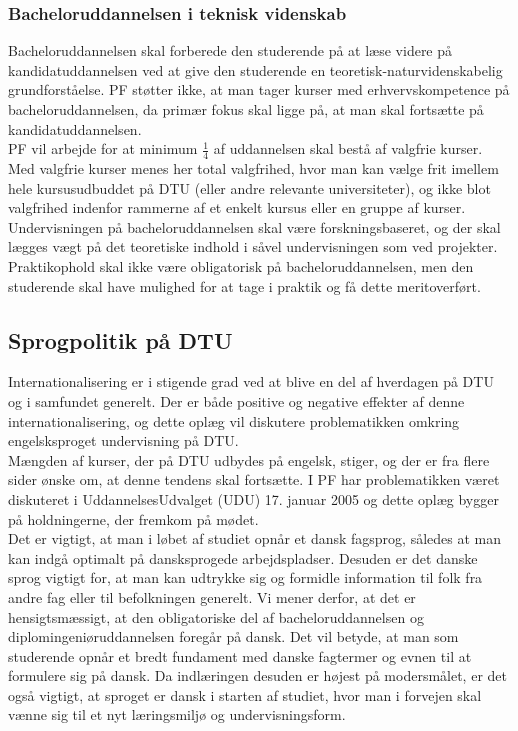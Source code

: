 \subsubsection{Bacheloruddannelsen i teknisk videnskab}
Bacheloruddannelsen skal forberede den studerende på at læse videre på kandidatuddannelsen ved at give den studerende en teoretisk-naturvidenskabelig grundforståelse. PF støtter ikke, at man tager kurser med erhvervskompetence på bacheloruddannelsen, da primær fokus skal ligge på, at man skal fortsætte på kandidatuddannelsen.\\

PF vil arbejde for at minimum $\frac{1}{4}$ af uddannelsen skal bestå af valgfrie kurser. Med valgfrie kurser menes her total valgfrihed, hvor man kan vælge frit imellem hele kursusudbuddet på DTU (eller andre relevante universiteter), og ikke blot valgfrihed indenfor rammerne af et enkelt kursus eller en gruppe af kurser.\\

Undervisningen på bacheloruddannelsen skal være forskningsbaseret, og der skal lægges vægt på det teoretiske indhold i såvel undervisningen som ved projekter. Praktikophold skal ikke være obligatorisk på bacheloruddannelsen, men den studerende skal have mulighed for at tage i praktik og få dette meritoverført.

\subsection{Sprogpolitik på DTU}
Internationalisering er i stigende grad ved at blive en del af hverdagen på DTU og i samfundet generelt. Der er både positive og negative effekter af denne internationalisering, og dette oplæg vil diskutere problematikken omkring engelsksproget undervisning på DTU.\\

Mængden af kurser, der på DTU udbydes på engelsk, stiger, og der er fra flere sider ønske om, at denne tendens skal fortsætte. I PF har problematikken været diskuteret i UddannelsesUdvalget (UDU) 17. januar 2005 og dette oplæg bygger på holdningerne, der fremkom på mødet.\\

Det er vigtigt, at man i løbet af studiet opnår et dansk fagsprog, således at man kan indgå optimalt på dansksprogede arbejdspladser. Desuden er det danske sprog vigtigt for, at man kan udtrykke sig og formidle information til folk fra andre fag eller til befolkningen generelt. Vi mener derfor, at det er hensigtsmæssigt, at den obligatoriske del af bacheloruddannelsen og diplomingeniøruddannelsen foregår på dansk. Det vil betyde, at man som studerende opnår et bredt fundament med danske fagtermer og evnen til at formulere sig på dansk. Da indlæringen desuden er højest på modersmålet, er det også vigtigt, at sproget er dansk i starten af studiet, hvor man i forvejen skal vænne sig til et nyt læringsmiljø og undervisningsform.\\

